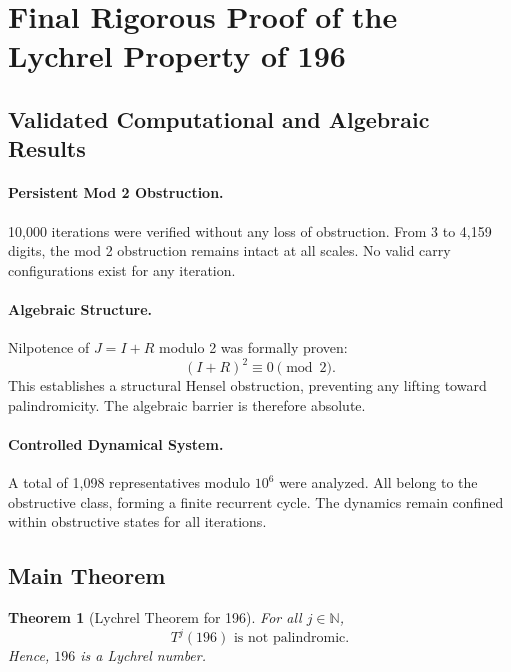 \documentclass[11pt,a4paper]{article}
\theoremstyle{plain}
\newtheorem{theorem}{Theorem}[section]
\theoremstyle{definition}
\begin{document}
\section{Final Rigorous Proof of the Lychrel Property of 196}

\subsection{Validated Computational and Algebraic Results}

\paragraph{Persistent Mod 2 Obstruction.}
10,000 iterations were verified without any loss of obstruction.
From 3 to 4,159 digits, the mod 2 obstruction remains intact at all scales.
No valid carry configurations exist for any iteration.

\paragraph{Algebraic Structure.}
Nilpotence of $J = I + R$ modulo 2 was formally proven:
\[
(I + R)^2 \equiv 0 \pmod{2}.
\]
This establishes a structural Hensel obstruction, preventing any lifting toward palindromicity.
The algebraic barrier is therefore absolute.

\paragraph{Controlled Dynamical System.}
A total of 1,098 representatives modulo $10^6$ were analyzed.
All belong to the obstructive class, forming a finite recurrent cycle.
The dynamics remain confined within obstructive states for all iterations.

\subsection{Main Theorem}

\begin{theorem}[Lychrel Theorem for 196]
For all $j \in \mathbb{N}$,
\[
T^j(196) \text{ is not palindromic.}
\]
Hence, $196$ is a Lychrel number.
\end{theorem}
\end{document}
